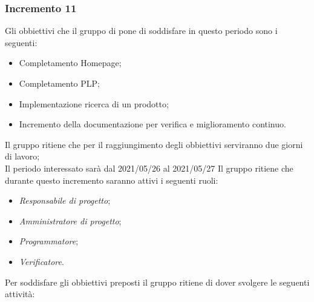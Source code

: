 \subsubsection{Incremento 11}
Gli obbiettivi che il gruppo di pone di soddisfare in questo periodo sono i seguenti:
\begin{itemize}
    \item Completamento Homepage;
    \item Completamento PLP;
    \item Implementazione ricerca di un prodotto;
    \item Incremento della documentazione per verifica e miglioramento continuo.
\end{itemize}
Il gruppo ritiene che per il raggiungimento degli obbiettivi serviranno due giorni di lavoro;\\
Il periodo interessato sarà dal 2021/05/26 al 2021/05/27
Il gruppo ritiene che durante questo incremento saranno attivi i seguenti ruoli:
\begin{itemize}
    \item \textit{Responsabile di progetto};
    \item \textit{Amministratore di progetto};
    \item \textit{Programmatore};
    \item \textit{Verificatore}.
\end{itemize}
Per soddisfare gli obbiettivi preposti il gruppo ritiene di dover svolgere le seguenti attività:
